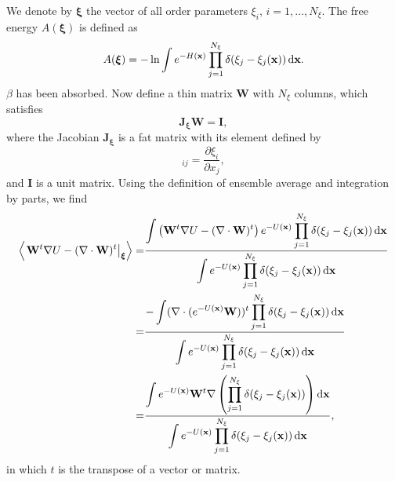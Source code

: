 We denote by $\boldsymbol{\xi}$ the vector of all order parameters $\xi_i,\,i=1,\dots,N_\xi$. The free energy $A(\boldsymbol{\xi})$ is defined as
\begin{equation}
    A(\boldsymbol{\xi})=-\ln\int e^{-H(\mathbf{x})}\prod_{j=1}^{N_\xi}\delta(\xi_j-\xi_j(\mathbf{x}))\mathop{}\!\mathrm{d} \mathbf{x}.
\end{equation}
$\beta$ has been absorbed. Now define a thin matrix $\mathbf{W}$ with $N_\xi$ columns, which satisfies
\begin{equation}
    \mathbf{J}_{\boldsymbol{\xi}} \mathbf{W}=\mathbf{I},
\end{equation} 
where the Jacobian $\mathbf{J}_{\boldsymbol{\xi}}$ is a fat matrix with its element defined by
\begin{equation}
    [\mathbf{J}_{\boldsymbol{\xi}}]_{ij}=\frac{\partial \xi_i}{\partial x_j},
\end{equation}
and $\mathbf{I}$ is a unit matrix. Using the definition of ensemble average and integration by parts, we find
\begin{align}
    \left<\left.\mathbf{W}^t\nabla U-(\nabla\cdot \mathbf{W})^t\right|_{\boldsymbol{\xi}}\right>=&\frac{\displaystyle\int\left(\mathbf{W}^t\nabla U-(\nabla\cdot \mathbf{W})^t\right)e^{-U(\mathbf{x})}\prod\limits_{j=1}^{N_\xi}\delta(\xi_j-\xi_j(\mathbf{x}))\mathop{}\!\mathrm{d} \mathbf{x}}{\displaystyle\int e^{-U(\mathbf{x})}\prod\limits_{j=1}^{N_\xi}\delta(\xi_j-\xi_j(\mathbf{x}))\mathop{}\!\mathrm{d} \mathbf{x}}\notag\\
    =&\frac{-\displaystyle\int (\nabla\cdot(e^{-U(\mathbf{x})}\mathbf{W}))^t\prod\limits_{j=1}^{N_\xi}\delta(\xi_j-\xi_j(\mathbf{x}))\mathop{}\!\mathrm{d}\mathbf{x}}{\displaystyle\int e^{-U(\mathbf{x})}\prod\limits_{j=1}^{N_\xi}\delta(\xi_j-\xi_j(\mathbf{x}))\mathop{}\!\mathrm{d} \mathbf{x}}\notag\\
    =&\frac{\displaystyle\int e^{-U(\mathbf{x})}\mathbf{W}^t\nabla\left(\prod\limits_{j=1}^{N_\xi}\delta(\xi_j-\xi_j(\mathbf{x}))\right)\mathop{}\!\mathrm{d} \mathbf{x}}{\displaystyle\int e^{-U(\mathbf{x})}\prod\limits_{j=1}^{N_\xi}\delta(\xi_j-\xi_j(\mathbf{x}))\mathop{}\!\mathrm{d} \mathbf{x}},
\end{align}
in which $t$ is the transpose of a vector or matrix.

